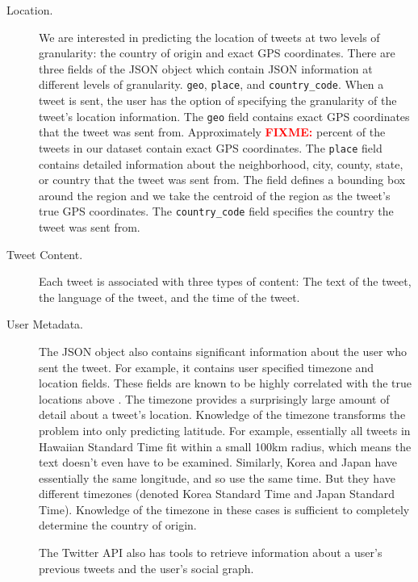 \documentclass[sigconf,10pt]{acmart}
\newcommand{\str}[1]{\texttt{#1}}
\newcommand{\fixme}[1]{\textcolor{red}{\textbf{FIXME:} {#1}}}
\begin{document}
\begin{description}
\item[Location.]
We are interested in predicting the location of tweets at two levels of granularity:
the country of origin and exact GPS coordinates.
There are three fields of the JSON object which contain JSON information at different levels of granularity.
\str{geo}, \str{place}, and \str{country\_code}.
When a tweet is sent, the user has the option of specifying the granularity of the tweet's location information.
The \str{geo} field contains exact GPS coordinates that the tweet was sent from.
Approximately \fixme{} percent of the tweets in our dataset contain exact GPS coordinates.
The \str{place} field contains detailed information about the neighborhood, city, county, state, or country that the tweet was sent from.
The field defines a bounding box around the region and we take the centroid of the region as the tweet's true GPS coordinates.
The \str{country\_code} field specifies the country the tweet was sent from.

\item[Tweet Content.]
Each tweet is associated with three types of content:
The text of the tweet,
the language of the tweet,
and the time of the tweet.

\item[User Metadata.]
The JSON object also contains significant information about the user who sent the tweet.
For example, it contains user specified timezone and location fields.
These fields are known to be highly correlated with the true locations above \citep{hecht2011tweets,schulz2013multi,han2014text}.
The timezone provides a surprisingly large amount of detail about a tweet's location.
Knowledge of the timezone transforms the problem into only predicting latitude.
For example, essentially all tweets in Hawaiian Standard Time fit within a small 100km radius, which means the text doesn't even have to be examined.
Similarly, Korea and Japan have essentially the same longitude, and so use the same time.
But they have different timezones (denoted Korea Standard Time and Japan Standard Time).
Knowledge of the timezone in these cases is sufficient to completely determine the country of origin.

The Twitter API also has tools to retrieve information about a user's previous tweets and the user's social graph.

\end{description}

\newpage
\end{document}
